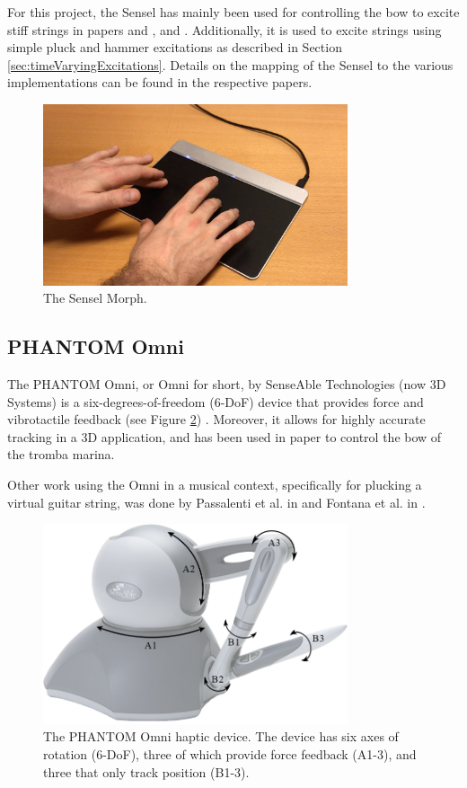 For this project, the Sensel has mainly been used for controlling the bow to excite stiff strings in papers \citeP[A] and \citeP[B], \citeP[C] and \citeP[D]. Additionally, it is used to excite strings using simple pluck and hammer excitations as described in Section \ref{sec:timeVaryingExcitations}. Details on the mapping of the Sensel to the various implementations can be found in the respective papers.

\begin{figure}[t]
    \centering
    \includegraphics[width=0.8\textwidth]{figures/contributions/realtime/senselHands.jpg}
    \caption{The Sensel Morph. \label{fig:sensel}}
\end{figure}


\subsection{PHANTOM Omni}\label{sec:phantomOmni}
The PHANTOM Omni, or Omni for short, by SenseAble Technologies (now 3D Systems) is a six-degrees-of-freedom (6-DoF) device that provides force and vibrotactile feedback (see Figure \ref{fig:omni}) \cite{OmniAPI2018}. Moreover, it allows for highly accurate tracking in a 3D application, and has been used in paper \citeP[E] to control the bow of the tromba marina. 

Other work using the Omni in a musical context, specifically for plucking a virtual guitar string, was done by Passalenti et al. in \cite{passalenti2019a, passalenti2019b} and Fontana et al. in \cite{Fontana2020}.

\begin{figure}[h]\includegraphics[width=0.8\textwidth]{figures/contributions/realtime/omniSchematic.png}
    \centering
      \caption{The PHANTOM Omni haptic device. The device has six axes of rotation (6-DoF), three of which provide force feedback (A1-3), and three that only track position (B1-3). \label{fig:omni}}
\end{figure}

